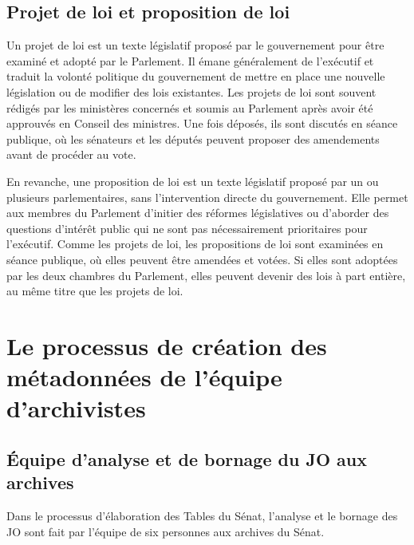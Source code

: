 \subsection{Projet de loi et proposition de loi}

Un projet de loi est un texte législatif proposé par le gouvernement pour être examiné et adopté par le Parlement. Il émane généralement de l'exécutif et traduit la volonté politique du gouvernement de mettre en place une nouvelle législation ou de modifier des lois existantes. Les projets de loi sont souvent rédigés par les ministères concernés et soumis au Parlement après avoir été approuvés en Conseil des ministres. Une fois déposés, ils sont discutés en séance publique, où les sénateurs et les députés peuvent proposer des amendements avant de procéder au vote.

En revanche, une proposition de loi est un texte législatif proposé par un ou plusieurs parlementaires, sans l'intervention directe du gouvernement. Elle permet aux membres du Parlement d'initier des réformes législatives ou d'aborder des questions d'intérêt public qui ne sont pas nécessairement prioritaires pour l'exécutif. Comme les projets de loi, les propositions de loi sont examinées en séance publique, où elles peuvent être amendées et votées. Si elles sont adoptées par les deux chambres du Parlement, elles peuvent devenir des lois à part entière, au même titre que les projets de loi.

\section{Le processus de création des métadonnées de l’équipe d’archivistes}

\subsection{Équipe d'analyse et de bornage du JO aux archives}
Dans le processus d'élaboration des Tables du Sénat, l'analyse et le \gls{bornage} des JO sont fait par l'équipe de six personnes aux archives du Sénat.

